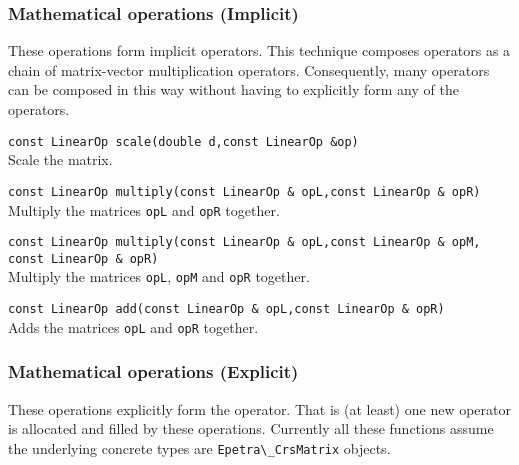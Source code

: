 \documentclass[12pt]{article}
\newcommand{\code}[1]{\lstinline[basicstyle=\footnotesize]!#1!}
\newcommand{\scode}[1]{\lstinline[basicstyle=\small\bfseries]!#1!}
\begin{document}
\subsubsection{Mathematical operations (Implicit)}
These operations form implicit operators. This technique composes
operators as a chain of matrix-vector multiplication operators. Consequently,
many operators can be composed in this way without having to explicitly
form any of the operators.

\begin{framed}
\begin{flushleft}
\scode{const LinearOp scale(double d,const LinearOp &op)} \\
Scale the matrix.

\vspace{10pt}
\scode{const LinearOp multiply(const LinearOp & opL,const LinearOp & opR)} \\
Multiply the matrices \code{opL} and \code{opR} together. 

\vspace{10pt}
\scode{const LinearOp multiply(const LinearOp & opL,const LinearOp & opM,} \\
\hspace{137pt} \scode{const LinearOp & opR)} \\
Multiply the matrices \code{opL}, \code{opM} and \code{opR} together. 

\vspace{10pt}
\scode{const LinearOp add(const LinearOp & opL,const LinearOp & opR)} \\
Adds the matrices \code{opL} and \code{opR} together. 
\end{flushleft}
\end{framed}

\subsubsection{Mathematical operations (Explicit)}
These operations explicitly form the operator. That is (at least) one new operator
is allocated and filled by these operations. Currently all these functions assume
the underlying concrete types are \code{Epetra\_CrsMatrix} objects.
\end{document}
